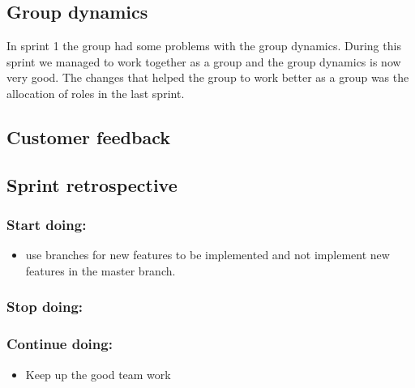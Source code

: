 \subsection{Group dynamics}
	In sprint 1 the group had some problems with the group dynamics. 
	During this sprint we managed to work together as a group and the group dynamics
	is now very good. The changes that helped the group to work better as a group
	was the allocation of roles in the last sprint. 

\subsection{Customer feedback}


\subsection{Sprint retrospective}
	\subsubsection*{Start doing: } 
		\begin{itemize}
			\item use branches for new features to be implemented and not implement new 
			features in the master branch.
		\end{itemize}
	\subsubsection*{Stop doing: }

	\subsubsection*{Continue doing: }
		\begin{itemize}
			\item Keep up the good team work
		\end{itemize}

